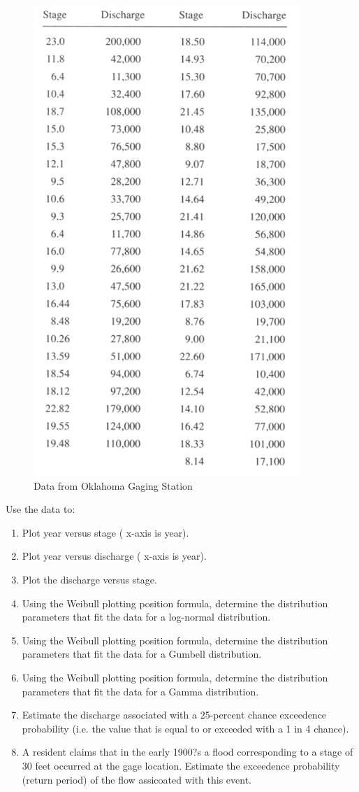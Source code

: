 \documentclass[12pt]{article}
\begin{document}
\begin{enumerate}
\begin{figure}[h!] %
   \centering
   \includegraphics[height=7in]{OklahomaData.jpg} 
   \caption{Data from Oklahoma Gaging Station}
   \label{fig:OklahomaData}
\end{figure}


Use the data to:
\begin{enumerate}
\item Plot year versus stage ( x-axis is year).
\item Plot year versus discharge ( x-axis is year).
\item Plot the discharge versus stage.
\item Using the Weibull plotting position formula, determine the distribution parameters that fit the data for a log-normal distribution.
\item Using the Weibull plotting position formula, determine the distribution parameters that fit the data for a Gumbell distribution.
\item Using the Weibull plotting position formula, determine the distribution parameters that fit the data for a Gamma distribution.
\item Estimate the discharge associated with a 25-percent chance exceedence probability (i.e. the value that is equal to or exceeded with a 1 in 4 chance).
\item A resident claims that in the early 1900?s a flood corresponding to a stage of 30 feet occurred at the gage location.  Estimate the exceedence probability (return period) of the flow assicoated with this event.
\end{enumerate}


\end{enumerate}
\end{document}

